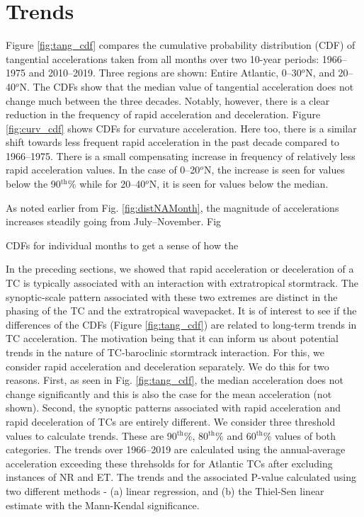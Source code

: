 \documentclass[wcd,manuscript]{copernicus}
\begin{document}
\section{Trends}

Figure \ref{fig:tang_cdf} compares the cumulative probability distribution (CDF) of tangential accelerations taken from all months over two 10-year periods: 1966--1975 and 2010--2019. Three regions are shown: Entire Atlantic,  0--30$^o$N, and 20--40$^o$N. The CDFs show that the median value of tangential acceleration does not change much between the three decades. Notably, however, there is a clear reduction in the frequency of rapid acceleration and deceleration. Figure \ref{fig:curv_cdf} shows CDFs for curvature acceleration. Here too, there is a similar shift towards less frequent rapid acceleration in the past decade compared to 1966--1975. There is a small compensating increase in frequency of relatively less rapid acceleration values. In the case of  0--20$^o$N, the increase is seen for values below the 90$^\text{th}$\% while for 20--40$^o$N, it is seen for values below the median.


As noted earlier from Fig. \ref{fig:distNAMonth}, the magnitude of accelerations increases steadily going from July--November. Fig

CDFs for individual months to get a sense of how the 


In the preceding sections, we showed that rapid acceleration or deceleration of a TC is typically associated with an interaction with extratropical stormtrack. The synoptic-scale pattern associated with these two extremes are distinct in the phasing of the TC and the extratropical wavepacket. It is of interest to see if the differences of the CDFs (Figure \ref{fig:tang_cdf}) are related to long-term trends in TC acceleration. The motivation being that it can inform us about potential trends in the nature of TC-baroclinic stormtrack interaction. For this, we consider rapid acceleration and deceleration separately. We do this for two reasons. First, as seen in Fig.  \ref{fig:tang_cdf}, the median acceleration does not change significantly and this is also the case for the mean acceleration (not shown). Second, the synoptic patterns associated with rapid acceleration and rapid deceleration of TCs are entirely different. We consider three threshold values to calculate trends. These are 90$^\text{th}$\%, 80$^\text{th}$\% and 60$^\text{th}$\% values of both categories. The trends over 1966--2019 are calculated using the annual-average acceleration exceeding these threhsolds for for Atlantic TCs after excluding instances of NR and ET. The trends and the associated P-value calculated using two different methods - (a) linear regression, and (b) the Thiel-Sen linear estimate with the Mann-Kendal significance.
\end{document}
